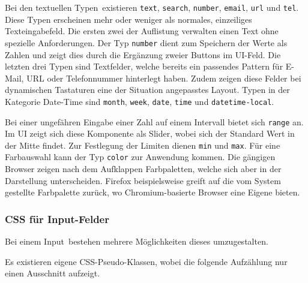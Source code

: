 Bei den textuellen Typen\footnotemark \ existieren \texttt{text}, \texttt{search}, \texttt{number}, \texttt{email}, \texttt{url} und \texttt{tel}.
Diese Typen erscheinen mehr oder weniger als normales, einzeiliges Texteingabefeld.
Die ersten zwei der Auflistung verwalten einen Text ohne spezielle Anforderungen. 
Der Typ \texttt{number} dient zum Speichern der Werte als Zahlen und zeigt dies durch die Ergänzung zweier Buttons im UI-Feld.
Die letzten drei Typen sind Textfelder, welche bereits ein passendes Pattern für E-Mail, URL oder Telefonnummer hinterlegt haben.
Zudem zeigen diese Felder bei dynamischen Tastaturen eine der Situation angepasstes Layout\footnotemark.
Typen in der Kategorie Date-Time sind \texttt{month}, \texttt{week}, \texttt{date}, \texttt{time} und \texttt{datetime-local}.

Bei einer ungefähren Eingabe einer Zahl auf einem Intervall bietet sich \texttt{range} an.
Im UI zeigt sich diese Komponente als Slider, wobei sich der Standard Wert in der Mitte findet.
Zur Festlegung der Limiten dienen \texttt{min} und \texttt{max}.
Für eine Farbauswahl kann der Typ \texttt{color} zur Anwendung kommen. 
Die gängigen Browser zeigen nach dem Aufklappen Farbpaletten, welche sich aber in der Darstellung unterscheiden. 
Firefox beispielsweise greift auf die vom System gestellte Farbpalette zurück, wo Chromium-basierte Browser eine Eigene bieten.


\subsubsection{{\color{dgray} CSS für Input-Felder}}
\label{sec:inputCss}

Bei einem Input\footnotemark \ bestehen mehrere Möglichkeiten dieses umzugestalten.

Es existieren eigene CSS-Pseudo-Klassen, wobei die folgende Aufzählung nur einen Ausschnitt aufzeigt.

